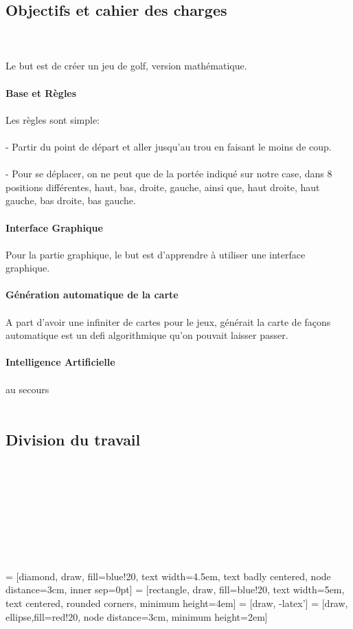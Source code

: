 \documentclass{article}
\begin{document}
\subsection{Objectifs et cahier des charges}
~\\~\\
Le but est de créer un jeu de golf, version mathématique.
\\~\\
\textbf{\large Base et Règles}
\\~\\
Les règles sont simple:
\\~\\
- Partir du point de départ et aller jusqu'au trou en faisant le moins de coup.
\\~\\
- Pour se déplacer, on ne peut que de la portée indiqué sur notre case, dans 8 positions différentes, haut, bas, droite, gauche, ainsi que, haut droite, haut gauche, bas droite, bas gauche.
\\~\\
\textbf{\large Interface Graphique}
\\~\\
Pour la partie graphique, le but est d'apprendre à utiliser une interface graphique.
\\~\\
\textbf{\large Génération automatique de la carte}
\\~\\
A part d'avoir une infiniter de cartes pour le jeux, générait la carte de façons automatique est un defi algorithmique qu'on pouvait laisser passer.
\\~\\
\textbf{\large Intelligence Artificielle}
\\~\\
au secours
\\~\\
\newpage
\subsection{Division du travail}
~\\~\\~\\~\\~\\~\\~\\~\\
 = [diamond, draw, fill=blue!20, 
    text width=4.5em, text badly centered, node distance=3cm, inner sep=0pt]
 = [rectangle, draw, fill=blue!20, 
    text width=5em, text centered, rounded corners, minimum height=4em]
 = [draw, -latex']
 = [draw, ellipse,fill=red!20, node distance=3cm,
    minimum height=2em]
\end{document}
